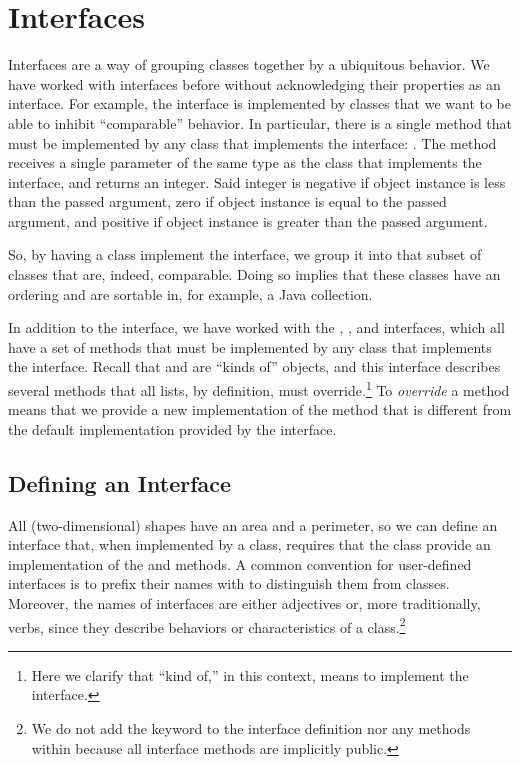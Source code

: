 \section{Interfaces}

Interfaces are a way of grouping classes together by a ubiquitous behavior. 
We have worked with interfaces before without acknowledging their properties as an interface.
For example, the  interface is implemented by classes that we want to be able to inhibit ``comparable'' behavior. 
In particular, there is a single method that must be implemented by any class that implements the  interface: . 
The  method receives a single parameter of the same type as the class that implements the  interface, and returns an integer. 
Said integer is negative if  object instance is less than the passed argument, zero if  object instance is equal to the passed argument, and positive if  object instance is greater than the passed argument.

So, by having a class implement the  interface, we group it into that subset of classes that are, indeed, comparable. 
Doing so implies that these classes have an ordering and are sortable in, for example, a Java collection. 

In addition to the  interface, we have worked with the , , and  interfaces, which all have a set of methods that must be implemented by any class that implements the interface. 
Recall that  and  are ``kinds of''  objects, and this interface describes several methods that all lists, by definition, must override.\footnote{Here we clarify that ``kind of,'' in this context, means to implement the  interface.} 
To \emph{override} a method means that we provide a new implementation of the method that is different from the default implementation provided by the interface.

\subsection*{Defining an Interface}

All (two-dimensional) shapes have an area and a perimeter, so we can define an interface that, when implemented by a class, requires that the class provide an implementation of the  and  methods. 
A common convention for user-defined interfaces is to prefix their names with  to distinguish them from classes. 
Moreover, the names of interfaces are either adjectives or, more traditionally, verbs, since they describe behaviors or characteristics of a class.\footnote{We do not add the  keyword to the interface definition nor any methods within because all interface methods are implicitly public.}

